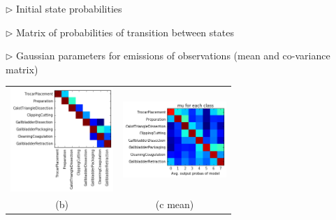 \documentclass[landscape,a0paper,fontscale=0.292]{baposter}
\begin{document}
\begin{poster}
{$\triangleright$ Initial state probabilities

$\triangleright$ Matrix of probabilities of transition between states

$\triangleright$ Gaussian parameters for emissions of observations (mean and co-variance matrix)


\begin{tabular}{cc}
\hspace{-3mm} \includegraphics[width=3.9cm]{../slides/images/index.png} & \hspace{-4mm} \includegraphics[width=3.9cm]{../slides/images/index2.png} \\
(b) & (c mean) \\
\end{tabular}


}

%
%
%
%
%
%
%


\end{poster}
\end{document}
